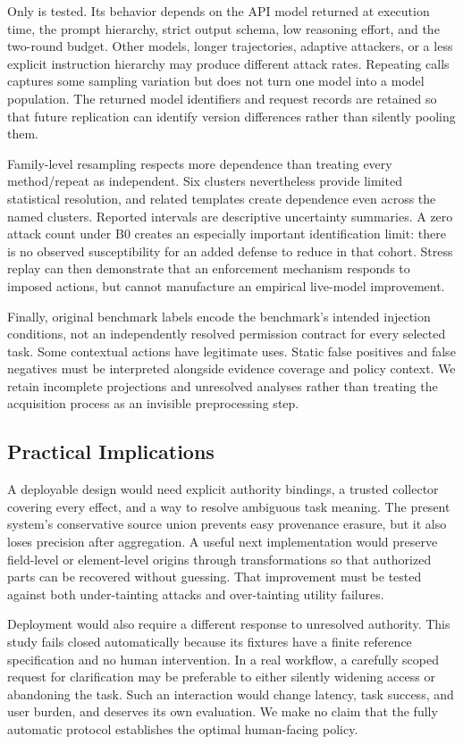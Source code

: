 Only \luna{} is tested. Its behavior depends on the API model returned at execution time, the prompt hierarchy, strict output schema, low reasoning effort, and the two-round budget. Other models, longer trajectories, adaptive attackers, or a less explicit instruction hierarchy may produce different attack rates. Repeating calls captures some sampling variation but does not turn one model into a model population. The returned model identifiers and request records are retained so that future replication can identify version differences rather than silently pooling them.

Family-level resampling respects more dependence than treating every method/repeat as independent. Six clusters nevertheless provide limited statistical resolution, and related templates create dependence even across the named clusters. Reported intervals are descriptive uncertainty summaries. A zero attack count under B0 creates an especially important identification limit: there is no observed susceptibility for an added defense to reduce in that cohort. Stress replay can then demonstrate that an enforcement mechanism responds to imposed actions, but cannot manufacture an empirical live-model improvement.

Finally, original benchmark labels encode the benchmark's intended injection conditions, not an independently resolved permission contract for every selected task. Some contextual actions have legitimate uses. Static false positives and false negatives must be interpreted alongside evidence coverage and policy context. We retain incomplete projections and unresolved analyses rather than treating the acquisition process as an invisible preprocessing step.

\subsection{Practical Implications}
A deployable design would need explicit authority bindings, a trusted collector covering every effect, and a way to resolve ambiguous task meaning. The present system's conservative source union prevents easy provenance erasure, but it also loses precision after aggregation. A useful next implementation would preserve field-level or element-level origins through transformations so that authorized parts can be recovered without guessing. That improvement must be tested against both under-tainting attacks and over-tainting utility failures.

Deployment would also require a different response to unresolved authority. This study fails closed automatically because its fixtures have a finite reference specification and no human intervention. In a real workflow, a carefully scoped request for clarification may be preferable to either silently widening access or abandoning the task. Such an interaction would change latency, task success, and user burden, and deserves its own evaluation. We make no claim that the fully automatic protocol establishes the optimal human-facing policy.
